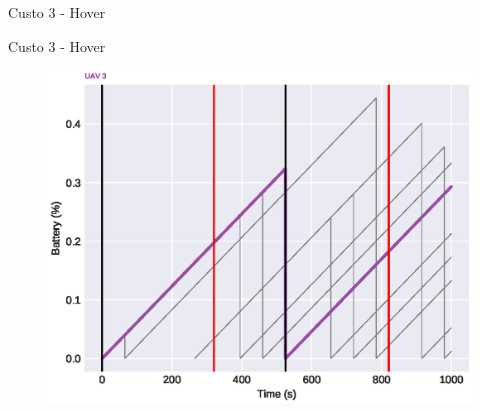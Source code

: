 \begin{frame}{Custo 3 - Hover}
\begin{figure}[!htb]
                 \end{figure}
            \end{frame}\begin{frame}{Custo 3 - Hover}
                \begin{figure}[!htb]
                     \includegraphics[width=\textwidth]{custo_3/uav_hover_acum_uav_3.eps}
                 \end{figure}
            \end{frame}